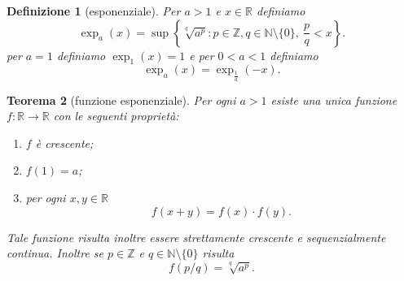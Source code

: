\documentclass[italian,a4paper,oneside,headinclude]{scrbook}
\newcommand{\NN}{\mathbb N}
\newcommand{\RR}{\mathbb R}
\newcommand{\ZZ}{\mathbb Z}
\newtheorem{theorem}{Teorema}
\newtheorem{definition}[theorem]{Definizione}
\begin{document}
\begin{definition}[esponenziale]
Per $a>1$ e $x\in \RR$ definiamo
\[
\exp_a(x) = \sup \left\{\sqrt[q]{a^p}\colon
  p\in \ZZ ,q\in \NN\setminus\{0\},
  \ \frac{p}{q} < x\right\}.
\]
per $a=1$ definiamo $\exp_1(x)=1$ e per $0<a<1$ definiamo
\[
  \exp_a(x) = \exp_{\frac 1 a}(-x).
\]
\end{definition}

\begin{theorem}[funzione esponenziale]
Per ogni $a>1$ esiste una unica funzione $f\colon \RR \to \RR$
con le seguenti proprietà:
\begin{enumerate}
\item $f$ è crescente;
\item $f(1) = a$;
\item per ogni $x,y\in \RR$
\[
f(x+y) = f(x)\cdot f(y).
\]
\end{enumerate}
Tale funzione risulta inoltre essere
strettamente crescente e
sequenzialmente continua.
Inoltre se $p\in \ZZ$ e $q\in \NN\setminus\{0\}$ risulta
\[
  f(p/q) = \sqrt[q]{a^p}.
\]
\end{theorem}
%
\end{document}
